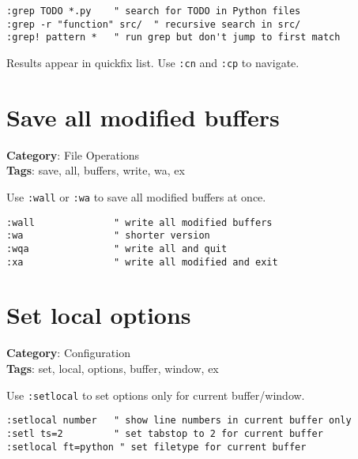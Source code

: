 {{{{{{\begin{Exa*}{}
\begin{Verbatim}[fontsize=\footnotesize, breaklines, breakanywhere]
:grep TODO *.py    " search for TODO in Python files
:grep -r "function" src/  " recursive search in src/
:grep! pattern *   " run grep but don't jump to first match
\end{Verbatim}
\end{Exa*}

Results appear in quickfix list. Use {\footnotesize \Verb§:cn§} and {\footnotesize \Verb§:cp§} to navigate.

\section{Save all modified buffers}

\textbf{Category}: File Operations\\ \textbf{Tags}: save, all, buffers, write, wa, ex
\vspace{0.5cm}

Use {\footnotesize \Verb§:wall§} or {\footnotesize \Verb§:wa§} to save all modified buffers at once.

\begin{Exa*}{}
\begin{Verbatim}[fontsize=\footnotesize, breaklines, breakanywhere]
:wall              " write all modified buffers
:wa                " shorter version
:wqa               " write all and quit
:xa                " write all modified and exit
\end{Verbatim}
\end{Exa*}

\section{Set local options}

\textbf{Category}: Configuration\\ \textbf{Tags}: set, local, options, buffer, window, ex
\vspace{0.5cm}

Use {\footnotesize \Verb§:setlocal§} to set options only for current buffer/window.

\begin{Exa*}{}
\begin{Verbatim}[fontsize=\footnotesize, breaklines, breakanywhere]
:setlocal number   " show line numbers in current buffer only
:setl ts=2         " set tabstop to 2 for current buffer
:setlocal ft=python " set filetype for current buffer
\end{Verbatim}
\end{Exa*}

}}}}}}
